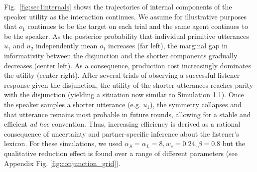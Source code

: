 Fig.~\ref{fig:sec1internals} shows the trajectories of internal components of the speaker utility as the interaction continues.
We assume for illustrative purposes that $o_1$ continues to be the target on each trial and the same agent continues to be the speaker.
As the posterior probability that individual primitive utterances $u_1$ and $u_2$ independently mean $o_1$ increases (far left), the marginal gap in informativity between the disjunction and the shorter components gradually decreases (center left).
As a consequence, production cost increasingly dominates the utility (center-right). 
After several trials of observing a successful listener response given the disjunction, the utility of the shorter utterances reaches parity with the disjunction (yielding a situation now similar to Simulation 1.1).
Once the speaker samples a shorter utterance (e.g. $u_1$), the symmetry collapses and that utterance remains most probable in future rounds, allowing for a stable and efficient \emph{ad hoc} convention.
Thus, increasing efficiency is derived as a rational consequence of uncertainty and partner-specific inference about the listener's lexicon.
For these simulations, we used $\alpha_S = \alpha_L = 8, w_c = 0.24, \beta=0.8$ but the qualitative reduction effect is found over a range of different parameters (see Appendix Fig. \ref{fig:conjunction_grid}). 
%
%
%




